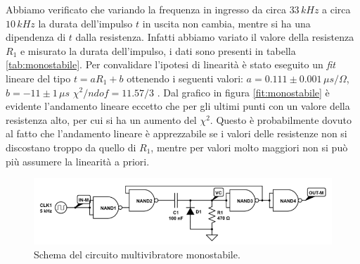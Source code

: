 \documentclass[10pt,a4paper]{article}
\begin{document}
Abbiamo verificato che variando la frequenza in ingresso da circa $33\,kHz$ a circa $10\,kHz$ la durata dell'impulso $t$ in uscita non cambia, mentre si ha una dipendenza di $t$ dalla resistenza. Infatti abbiamo variato il valore della resistenza $R_1$ e misurato la durata dell'impulso, i dati sono presenti in tabella \ref{tab:monostabile}. Per convalidare l'ipotesi di linearità è stato eseguito un \emph{fit} lineare del tipo $t=aR_1+b$ ottenendo i seguenti valori: $a=0.111\pm0.001\,\mu s/\Omega$, $b= -11\pm1\,\mu s$ $\chi^2/ndof=11.57/3$ . Dal grafico in figura \ref{fit:monostabile} è evidente l'andamento lineare eccetto che per gli ultimi punti con un valore della resistenza alto, per cui si ha un aumento del $\chi^2$. Questo è probabilmente dovuto al fatto che l'andamento lineare è apprezzabile se i valori delle resistenze non si discostano troppo da quello di $R_1$, mentre per valori molto maggiori non si può più assumere la linearità a priori.





\begin{figure}[!htb]
  \centering
  \includegraphics[scale=0.5]{monostabile.png}
\caption{Schema del circuito multivibratore monostabile.\label{fig:monostabile}}
\end{figure}
\end{document}
